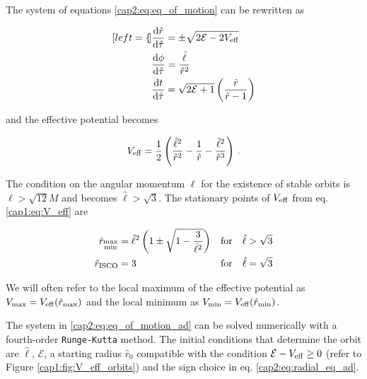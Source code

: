The system of equations \ref{cap2:eq:eq_of_motion} can be rewritten as

\begin{subequations}
    \begin{align}[left = {\empheqlbrace}]
        &\dv{\hat r}{\hat \tau} = \pm \sqrt{2 \mathcal E - 2 V_{\rm eff}}
        \label{cap2:eq:radial_eq_ad} \\
        &\dv{\phi}{\hat \tau} = \frac{\hat \ell}{\hat r^2}
        \label{cap2:eq:angular_eq_ad} \\
        &\dv{t}{\hat \tau} = \sqrt{2 \mathcal E + 1}
        \left(\frac{\hat r}{\hat r - 1}\right) \label{cap2:eq:time_eq_ad}
    \end{align}
    \label{cap2:eq:eq_of_motion_ad}
\end{subequations}

and the effective potential becomes

\begin{equation}
    V_{\rm eff} = \frac{1}{2} \left(\frac{\hat \ell^2}{\hat r^2}
    - \frac{1}{\hat r} - \frac{\hat \ell^2}{\hat r^3} \right) \, .
\end{equation}

The condition on the angular momentum $\ell$ for the existence of stable orbits
is $\ell > \sqrt{12} M$ and becomes $\hat \ell > \sqrt{3}$.
The stationary points of $V_{\rm eff}$ from eq. \ref{cap1:eq:V_eff} are

\begin{subequations}
    \begin{align}
        \hat r_{\substack{\rm max \\ \rm min}} &= \hat \ell^2
        \left(1 \pm \sqrt{1 - \frac{3}{\hat \ell^2}} \right)
        &&{\rm for} \quad \hat \ell > \sqrt{3} \\
        \hat r_{\rm ISCO} &= 3
        &&{\rm for} \quad \hat \ell = \sqrt{3}
    \end{align}
\end{subequations}

We will often refer to the local maximum of the effective potential as
$V_{\rm max} = V_{\rm eff}(\hat r_{\rm max})$ and the local minimum as
$V_{\rm min} = V_{\rm eff}(\hat r_{\rm min})$.

The system in \ref{cap2:eq:eq_of_motion_ad} can be solved numerically with
a fourth-order \texttt{Runge-Kutta} method.
The initial conditions that determine the orbit are $\hat \ell$,
$\mathcal E$, a starting radius $\hat r_0$ compatible with the condition
$\mathcal E - V_{\rm eff} \geq 0$ (refer to Figure
\ref{cap1:fig:V_eff_orbits}) and the sign choice in eq.
\ref{cap2:eq:radial_eq_ad}.


